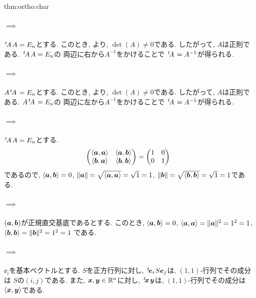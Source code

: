 \begin{proofof}{thm:ortho:char}
  \paragraph{$\implies$}
  ${\left.^{t}\!A\right.}A=E_n$とする.
  このとき, より,
  $\det(A)\neq 0$である.
  したがって, $A$は正則である.
  ${\left.^{t}\!A\right.}A=E_n$の
  両辺に右から$A^{-1}$をかけることで
  ${\left.^{t}\!A\right.}=A^{-1}$が得られる.

  \paragraph{$\implies$}
  $A{\left.^{t}\!A\right.}=E_n$とする.
  このとき, より,
  $\det(A)\neq 0$である.
  したがって, $A$は正則である.
  $A{\left.^{t}\!A\right.}=E_n$の
  両辺に左から$A^{-1}$をかけることで
  ${\left.^{t}\!A\right.}=A^{-1}$が得られる.

  \paragraph{$\implies$}
  ${\left.^{t}\!A\right.}A=E_n$とする.
  \begin{align*}
    \begin{pmatrix}
      \Braket{\boldsymbol{a},\boldsymbol{a}}&\Braket{\boldsymbol{a},\boldsymbol{b}}\\
      \Braket{\boldsymbol{b},\boldsymbol{a}}&\Braket{\boldsymbol{b},\boldsymbol{b}}
    \end{pmatrix}=
    \begin{pmatrix}
      1&0\\
      0&1
    \end{pmatrix}
  \end{align*}
  であるので, 
  $\Braket{\boldsymbol{a},\boldsymbol{b}}=0$, $\|\boldsymbol{a}\|=\sqrt{\Braket{\boldsymbol{a},\boldsymbol{a}}}=\sqrt{1}=1$,
  $\|\boldsymbol{b}\|=\sqrt{\Braket{\boldsymbol{b},\boldsymbol{b}}}=\sqrt{1}=1$である.
  \paragraph{$\implies$}
  $(\boldsymbol{a},\boldsymbol{b})$が正規直交基底であるとする.
  このとき,
  $\Braket{\boldsymbol{a},\boldsymbol{b}}=0$,
  $\Braket{\boldsymbol{a},\boldsymbol{a}}=\|\boldsymbol{a}\|^2=1^2=1$,
  $\Braket{\boldsymbol{b},\boldsymbol{b}}=\|\boldsymbol{b}\|^2=1^2=1$
  である.
  


  \paragraph{$\implies$}
  $\ee_i$を基本ベクトルとする.
  $S$を正方行列に対し,
  ${\left.^{t}\!\boldsymbol{e}_{i}\right.}S\boldsymbol{e}_{j}$は,
  $(1,1)$-行列でその成分は
  $S$の$(i,j)$である.
  また, $\boldsymbol{x},\boldsymbol{y}\in\mathbb{R}^n$に対し,
  ${\left.^{t}\!\boldsymbol{x}\right.}\boldsymbol{y}$は, $(1,1)$-行列でその成分は
  $\Braket{\boldsymbol{x},\boldsymbol{y}}$である.


\end{proofof}
